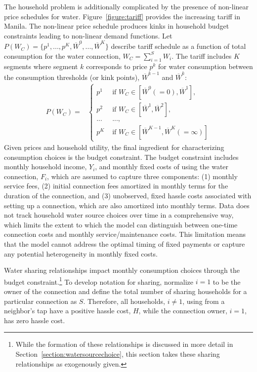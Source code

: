 \documentclass[12pt]{article}
\begin{document}
The household problem is additionally complicated by the presence of non-linear price schedules for water.  Figure~\ref{figure:tariff} provides the increasing tariff in Manila.  The non-linear price schedule produces kinks in household budget constraints leading to non-linear demand functions.  Let $P(W_C) = \{ p^{1},...,p^{K},\overline{W}^{0},...,\overline{W}^{K}\}$ describe tariff schedule as a function of total consumption for the water connection, $W_C = \sum_{i=1}^{S} W_i$.  The tariff includes $K$ segments where segment $k$ corresponds to price $p^{k}$ for water consumption between the consumption thresholds (or kink points), $\overline{W}^{k-1}$ and $\overline{W}^{k}$:
\begin{align*}
P(W_C)=&  
\begin{cases}
      p^{1} &\text{ if } W_C \in [\overline{W}^{0}(=0),\overline{W}^{1}], \\
      p^{2} &\text{ if } W_C \in [\overline{W}^{1},\overline{W}^{2}], \\
      ...   &\text{ ...}, \\
      p^{K} &\text{ if } W_C \in[\overline{W}^{K-1},\overline{W}^{K}(=\infty)]
    \end{cases}
\end{align*}
Given prices and household utility, the final ingredient for characterizing consumption choices is the budget constraint.  The budget constraint includes monthly household income, $Y_i$, and monthly fixed costs of using the water connection, $F_i$, which are assumed to capture three components: (1) monthly service fees, (2) initial connection fees amortized in monthly terms for the duration of the connection, and (3) unobserved, fixed hassle costs associated with setting up a connection, which are also amortized into monthly terms.  Data does not track household water source choices over time in a comprehensive way, which limits the extent to which the model can distinguish between one-time connection costs and monthly service/maintenance costs.  This limitation means that the model cannot address the optimal timing of fixed payments or capture any potential heterogeneity in monthly fixed costs.

Water sharing relationships impact monthly consumption choices through the budget constraint.\footnote{While the formation of these relationships is discussed in more detail in Section~\ref{section:watersourcechoice}, this section takes these sharing relationships as exogenously given.}  To develop notation for sharing, normalize $i=1$ to be the owner of the connection and define the total number of sharing households for a particular connection as $S$.  Therefore, all households, $i\neq1$, using from a neighbor's tap have a positive hassle cost, $H$, while the connection owner, $i=1$, has zero hassle cost.
\end{document}
